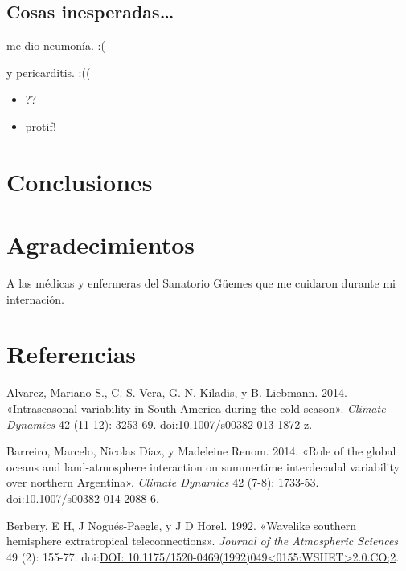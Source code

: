 \documentclass[spanish,a4paper,12p]{book}
\providecommand{\tightlist}{%
  \setlength{\itemsep}{0pt}\setlength{\parskip}{0pt}}
\begin{document}
\section{Cosas inesperadas\ldots{}}\label{cosas-inesperadas}

me dio neumonía. :(

y pericarditis. :((

\begin{itemize}
\tightlist
\item
  ??
\item
  protif!
\end{itemize}

\chapter{Conclusiones}\label{conclusiones}

\chapter{Agradecimientos}\label{agradecimientos}

A las médicas y enfermeras del Sanatorio Güemes que me cuidaron durante
mi internación.

\chapter*{Referencias}\label{referencias}

\hypertarget{refs}{}
\hypertarget{ref-Alvarez2014}{}
Alvarez, Mariano S., C. S. Vera, G. N. Kiladis, y B. Liebmann. 2014.
«Intraseasonal variability in South America during the cold season».
\emph{Climate Dynamics} 42 (11-12): 3253-69.
doi:\href{https://doi.org/10.1007/s00382-013-1872-z}{10.1007/s00382-013-1872-z}.

\hypertarget{ref-Barreiro2014}{}
Barreiro, Marcelo, Nicolas Díaz, y Madeleine Renom. 2014. «Role of the
global oceans and land-atmosphere interaction on summertime interdecadal
variability over northern Argentina». \emph{Climate Dynamics} 42 (7-8):
1733-53.
doi:\href{https://doi.org/10.1007/s00382-014-2088-6}{10.1007/s00382-014-2088-6}.

\hypertarget{ref-Berbery1992}{}
Berbery, E H, J Nogués-Paegle, y J D Horel. 1992. «Wavelike southern
hemisphere extratropical teleconnections». \emph{Journal of the
Atmospheric Sciences} 49 (2): 155-77.
doi:\href{https://doi.org/DOI:\%2010.1175/1520-0469(1992)049\%3C0155:WSHET\%3E2.0.CO;2}{DOI: 10.1175/1520-0469(1992)049\textless{}0155:WSHET\textgreater{}2.0.CO;2}.
\end{document}
